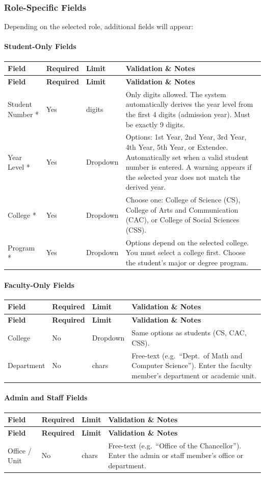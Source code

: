 \documentclass[12pt, a4paper]{article}
\newenvironment{fieldtable}{%
  \begin{longtable}{|>{\raggedright\arraybackslash}p{2.2cm}|>{\centering\arraybackslash}p{1.8cm}|>{\raggedright\arraybackslash}p{2.2cm}|>{\raggedright\arraybackslash}p{7.3cm}|}
  \hline
  \rowcolor{lightgray}
  \textbf{Field} & \textbf{Required} & \textbf{Limit} & \textbf{Validation \& Notes} \\
  \hline
  \endfirsthead
  \hline
  \rowcolor{lightgray}
  \textbf{Field} & \textbf{Required} & \textbf{Limit} & \textbf{Validation \& Notes} \\
  \hline
  \endhead
  \hline
  \endfoot
}{%
  \end{longtable}
}
\newcommand{\fieldrow}[4]{%
  #1 & #2 & #3 & #4 \\ \hline
}
\begin{document}
\subsubsection{Role-Specific Fields}

Depending on the selected role, additional fields will appear:

\paragraph{Student-Only Fields}

\begin{fieldtable}
  \fieldrow{Student Number *}{Yes}{9 digits}{Only digits allowed. The system automatically derives the year level from the first 4 digits (admission year). Must be exactly 9 digits.}
  \fieldrow{Year Level *}{Yes}{Dropdown}{Options: 1st Year, 2nd Year, 3rd Year, 4th Year, 5th Year, or Extendee. Automatically set when a valid student number is entered. A warning appears if the selected year does not match the derived year.}
  \fieldrow{College *}{Yes}{Dropdown}{Choose one: College of Science (CS), College of Arts and Communication (CAC), or College of Social Sciences (CSS).}
  \fieldrow{Program *}{Yes}{Dropdown}{Options depend on the selected college. You must select a college first. Choose the student's major or degree program.}
\end{fieldtable}

\paragraph{Faculty-Only Fields}

\begin{fieldtable}
  \fieldrow{College}{No}{Dropdown}{Same options as students (CS, CAC, CSS).}
  \fieldrow{Department}{No}{64 chars}{Free-text (e.g.\ ``Dept.\ of Math and Computer Science''). Enter the faculty member's department or academic unit.}
\end{fieldtable}

\paragraph{Admin and Staff Fields}

\begin{fieldtable}
  \fieldrow{Office / Unit}{No}{64 chars}{Free-text (e.g.\ ``Office of the Chancellor''). Enter the admin or staff member's office or department.}
\end{fieldtable}
\end{document}
